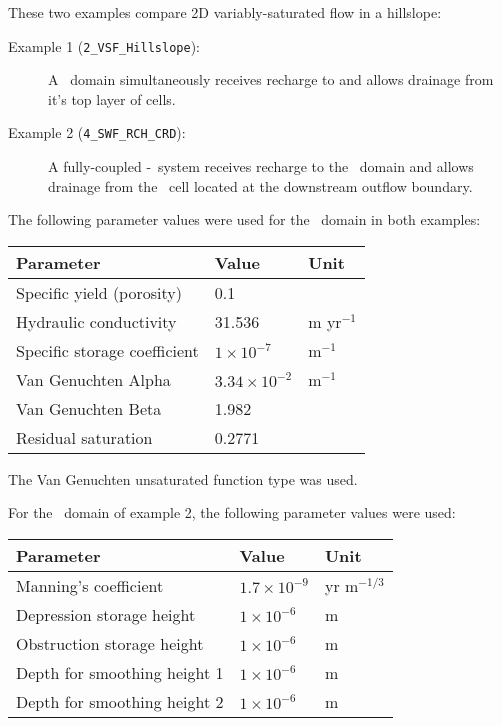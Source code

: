 \label{section:2d_hillslope_example}
These two examples compare 2D variably-saturated flow in a hillslope:
\begin{description}
    \item [Example 1 (\texttt{2\_VSF\_Hillslope}):] A \gwf\ domain  simultaneously receives recharge to and allows drainage from it's top layer of cells.
    \item [Example 2 (\texttt{4\_SWF\_RCH\_CRD}):] A fully-coupled \gwf-\swf\ system receives recharge to the \swf\ domain and allows drainage from the \swf\ cell located at the downstream outflow boundary.
\end{description}

The following parameter values were used for the \gwf\ domain in both examples:

\begin{center}
    \begin{tabular}{lll}  \hline
        Parameter                             & Value & Unit                                \\ \hline
        Specific yield (porosity)             &  0.1                        &               \\
        Hydraulic conductivity                &  31.536    &   m yr$^{-1}$  \\
        Specific storage coefficient          &  $ 1 \times 10^{-7}$        &   m$^{-1}$    \\
        Van Genuchten Alpha         &  $3.34 \times 10^{-2}$                        &   m$^{-1}$    \\
        Van Genuchten Beta          &  1.982                          &               \\
        Residual saturation                   &  0.2771                        &               \\
    \hline
    \end{tabular}
\end{center}

The Van Genuchten unsaturated function type was used.

For the \swf\ domain of example 2, the following parameter values were used:

\begin{center}
    \begin{tabular}{lll}  \hline
        Parameter                           & Value                     &   Unit            \\ \hline
        Manning's coefficient               &  $1.7 \times 10^{-9}$     &   yr m$^{-1/3}$   \\
        Depression storage height           &  $1 \times 10^{-6}$       &   m               \\
        Obstruction storage height          &  $1 \times 10^{-6}$       &   m               \\
        Depth for smoothing height 1        &  $1 \times 10^{-6}$       &   m               \\
        Depth for smoothing height 2        &  $1 \times 10^{-6}$       &   m               \\
    \hline
    \end{tabular}
\end{center}


